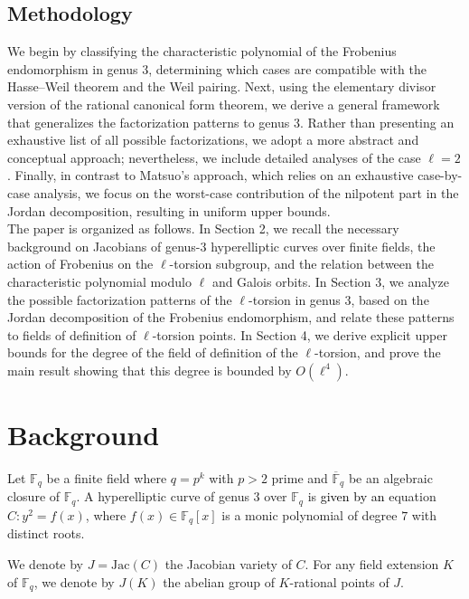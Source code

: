 \documentclass[11pt,a4paper]{article}
\theoremstyle{plain}
\theoremstyle{definition}
\theoremstyle{remark}
\newcommand{\verde}[1]{\textcolor{black}{#1}}
\begin{document}
\subsection{Methodology}
 We begin by classifying the characteristic polynomial of the Frobenius endomorphism in genus 3, determining which cases are compatible with the Hasse--Weil theorem and the Weil pairing. Next, using the elementary divisor version of the rational canonical form theorem, we derive a general framework that generalizes the factorization patterns to genus 3. Rather than presenting an exhaustive list of all possible factorizations, we adopt a more abstract and conceptual approach; nevertheless, we include detailed analyses of the case $\ell=2$.
Finally, in contrast to Matsuo's approach, which relies on an exhaustive case-by-case analysis, we focus on the worst-case contribution of the nilpotent part in the Jordan decomposition, resulting in uniform upper bounds.\\
 The paper is organized as follows. In Section 2, we recall the necessary background on Jacobians of genus-3 hyperelliptic curves over finite fields, the action of Frobenius on the $\ell$-torsion subgroup, and the relation between the characteristic polynomial modulo $\ell$ and Galois orbits. In Section 3, we analyze the possible factorization patterns of the $\ell$-torsion in genus 3, based on the Jordan decomposition of the Frobenius endomorphism, and relate these patterns to fields of definition of $\ell$-torsion points.
In Section 4, we derive explicit upper bounds for the degree of the field of definition of the $\ell$-torsion, and prove the main result showing that this degree is bounded by $O(\ell^4)$.


\section{Background}


 Let \( \mathbb{F}_q \) be a finite field where $q=p^k$ with $p>2$ prime and \( \overline{\mathbb{F}}_q \) be an algebraic closure of \( \mathbb{F}_q \).
A hyperelliptic curve of genus \( 3 \) over \( \mathbb{F}_q \) is \verde {given by an} equation \( C :y^2=f(x)\), where $f(x)\in \mathbb{F}_q[x]$ is a monic polynomial of degree $7$ with distinct roots.

We denote by \( J = \mathrm{Jac}(C) \) the Jacobian variety of $C$. For any field extension $K$ of $\mathbb{F}_q$, we denote by $J(K)$ the abelian group of $K$-rational points of $J$. 
\end{document}
